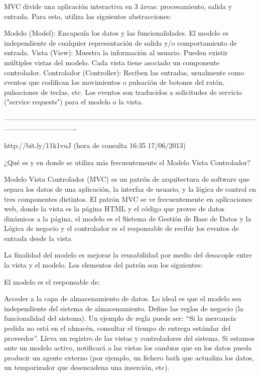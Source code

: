 MVC divide una aplicación interactiva en 3 áreas: procesamiento, salida y entrada. Para esto, utiliza las siguientes abstracciones:

    Modelo (Model): Encapsula los datos y las funcionalidades. El modelo es independiente de cualquier representación de salida y/o 
     comportamiento de entrada.
    Vista (View): Muestra la información al usuario. Pueden existir múltiples vistas del modelo. Cada vista tiene asociado un componente 
     controlador.
    Controlador (Controller): Reciben las entradas, usualmente como eventos que codifican los movimientos o pulsación de botones del 
     ratón, pulsaciones de teclas, etc. Los eventos son traducidos a solicitudes de servicio ("service requests") para el modelo o la vista.

-------------------------------------------------------------------------------------------------------------------------------------------


http://bit.ly/11k1vuJ (hora de consulta 16:35 17/06/2013)

¿Qué es y en donde se utiliza más frecuentemente el Modelo Vista Controlador?

Modelo Vista Controlador (MVC) es un patrón de arquitectura de software que separa los datos de una aplicación, la interfaz de usuario, 
y la lógica de control en tres componentes distintos. El patrón MVC se ve frecuentemente en aplicaciones web, donde la vista es la 
página HTML y el código que provee de datos dinámicos a la página, el modelo es el Sistema de Gestión de Base de Datos y la Lógica de 
negocio y el controlador es el responsable de recibir los eventos de entrada desde la vista

La finalidad del modelo es mejorar la reusabilidad por medio del desacople entre la vista y el modelo. Los elementos del patrón son
los siguientes:

El modelo es el responsable de:

    Acceder a la capa de almacenamiento de datos. Lo ideal es que el modelo sea independiente del sistema de almacenamiento.
    Define las reglas de negocio (la funcionalidad del sistema). Un ejemplo de regla puede ser: “Si la mercancía pedida no está en 
    el almacén, consultar el tiempo de entrega estándar del proveedor”.
    Lleva un registro de las vistas y controladores del sistema.
    Si estamos ante un modelo activo, notificará a las vistas los cambios que en los datos pueda producir un agente externo (por 
    ejemplo, un fichero bath que actualiza los datos, un temporizador que desencadena una inserción, etc).

